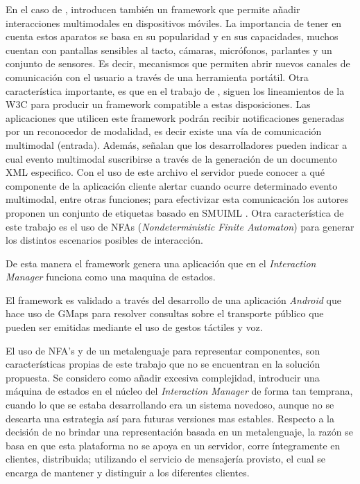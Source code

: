 En el caso de \citet{cutugno2012multimodal}, introducen también un framework que permite añadir interacciones multimodales en dispositivos móviles. La importancia de tener en cuenta estos aparatos se basa en su popularidad y en sus capacidades, muchos cuentan con pantallas sensibles al tacto, cámaras, micrófonos, parlantes y un conjunto de sensores. Es decir, mecanismos que permiten abrir nuevos canales de comunicación con el usuario a través de una herramienta portátil. Otra característica importante, es que en el trabajo de \citet{cutugno2012multimodal}, siguen los lineamientos de la W3C \citep{w3c:mmiframework} \citep{w3c:mmiarch} para producir un framework compatible a estas disposiciones. Las aplicaciones que utilicen este framework podrán recibir notificaciones generadas por un reconocedor de modalidad, es decir existe una vía de comunicación multimodal (entrada). Además, señalan que los desarrolladores pueden indicar a cual evento multimodal suscribirse a través de la generación de un documento XML especifico. Con el uso de este archivo el servidor puede conocer a qué componente de la aplicación cliente alertar cuando ocurre determinado evento multimodal, entre otras funciones; para efectivizar esta comunicación los autores proponen un conjunto de etiquetas basado en SMUIML \citep{dumas2008prototyping}. Otra característica de este trabajo es el uso de NFAs (\emph{Nondeterministic Finite Automaton}) para generar los distintos escenarios posibles de interacción. 

De esta manera el framework genera una aplicación que en el \emph{Interaction Manager} funciona como una maquina de estados. 

El framework es validado a través del desarrollo de una aplicación \emph{Android} que hace uso de GMaps para resolver consultas sobre el transporte público que pueden ser emitidas mediante el uso de gestos táctiles y voz.

El uso de NFA's y de un metalenguaje para representar componentes, son características propias de este trabajo que no se encuentran en la solución propuesta. Se considero como añadir excesiva complejidad, introducir una máquina de estados en el núcleo del \emph{Interaction Manager} de forma tan temprana, cuando lo que se estaba desarrollando era un sistema novedoso, aunque no se descarta una estrategia así para futuras versiones mas estables. Respecto a la decisión de no brindar una representación basada en un metalenguaje, la razón se basa en que esta plataforma no se apoya en un servidor, corre íntegramente en clientes, distribuida; utilizando el servicio de mensajería provisto, el cual se encarga de mantener y distinguir a los diferentes clientes.

